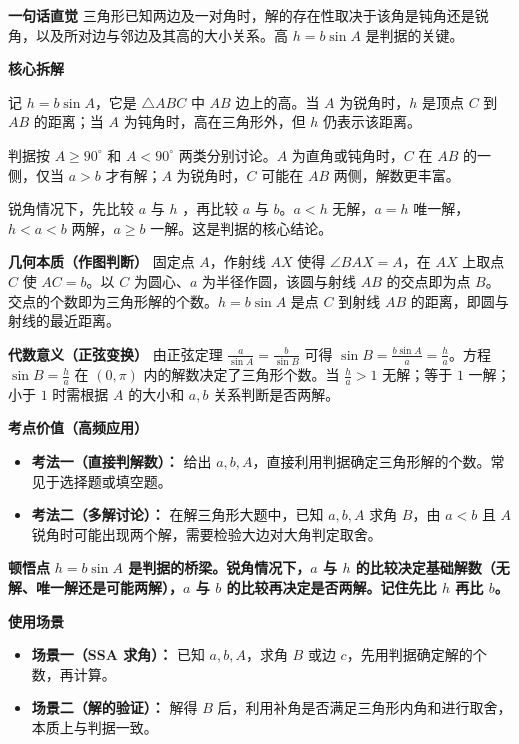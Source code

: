 \begin{explanationbox}
	\textbf{\textcolor{CExplanation}{一句话直觉}}
	三角形已知两边及一对角时，解的存在性取决于该角是钝角还是锐角，以及所对边与邻边及其高的大小关系。高 $h = b\sin A$ 是判据的关键。

	\medskip
	\textbf{\textcolor{CExplanation}{核心拆解}}
	\begin{description}[style=nextline, leftmargin=2.8em, labelsep=0.5em, itemsep=0.45em]
		\item[\textbf{要点一（几何高 h）：}]
			记 $h = b\sin A$，它是 $\triangle ABC$ 中 $AB$ 边上的高。当 $A$ 为锐角时，$h$ 是顶点 $C$ 到 $AB$ 的距离；当 $A$ 为钝角时，高在三角形外，但 $h$ 仍表示该距离。
		\item[\textbf{要点二（角分类）：}]
			判据按 $A\geq90^\circ$ 和 $A<90^\circ$ 两类分别讨论。$A$ 为直角或钝角时，$C$ 在 $AB$ 的一侧，仅当 $a>b$ 才有解；$A$ 为锐角时，$C$ 可能在 $AB$ 两侧，解数更丰富。
		\item[\textbf{要点三（大小比较）：}]
			锐角情况下，先比较 $a$ 与 $h$ ，再比较 $a$ 与 $b$。$a<h$ 无解，$a=h$ 唯一解，$h<a<b$ 两解，$a\geq b$ 一解。这是判据的核心结论。
	\end{description}

	\medskip
	\textbf{\textcolor{CExplanation}{几何本质（作图判断）}}
	固定点 $A$，作射线 $AX$ 使得 $\angle BAX = A$，在 $AX$ 上取点 $C$ 使 $AC=b$。以 $C$ 为圆心、$a$ 为半径作圆，该圆与射线 $AB$ 的交点即为点 $B$。交点的个数即为三角形解的个数。$h = b\sin A$ 是点 $C$ 到射线 $AB$ 的距离，即圆与射线的最近距离。

	\medskip
	\textbf{\textcolor{CExplanation}{代数意义（正弦变换）}}
	由正弦定理 $\frac{a}{\sin A}=\frac{b}{\sin B}$ 可得 $\sin B = \frac{b\sin A}{a} = \frac{h}{a}$。方程 $\sin B = \frac{h}{a}$ 在 $(0,\pi)$ 内的解数决定了三角形个数。当 $\frac{h}{a}>1$ 无解；等于 $1$ 一解；小于 $1$ 时需根据 $A$ 的大小和 $a,b$ 关系判断是否两解。

	\medskip
	\textbf{\textcolor{CExplanation}{考点价值（高频应用）}}
	\begin{itemize}[leftmargin=*, itemsep=0.5em, topsep=0.4em]
		\item \textbf{考法一（直接判解数）：} 给出 $a,b,A$，直接利用判据确定三角形解的个数。常见于选择题或填空题。
		\item \textbf{考法二（多解讨论）：} 在解三角形大题中，已知 $a,b,A$ 求角 $B$，由 $a<b$ 且 $A$ 锐角时可能出现两个解，需要检验大边对大角判定取舍。
	\end{itemize}

	\medskip
	\textbf{\textcolor{CExplanation}{顿悟点}}
	\textbf{$h = b\sin A$ 是判据的桥梁。锐角情况下，$a$ 与 $h$ 的比较决定基础解数（无解、唯一解还是可能两解），$a$ 与 $b$ 的比较再决定是否两解。记住先比 $h$ 再比 $b$。}

	\medskip
	\textbf{\textcolor{CExplanation}{使用场景}}
	\begin{itemize}[leftmargin=*, itemsep=0.5em, topsep=0.4em]
		\item \textbf{场景一（SSA 求角）：} 已知 $a,b,A$，求角 $B$ 或边 $c$，先用判据确定解的个数，再计算。
		\item \textbf{场景二（解的验证）：} 解得 $B$ 后，利用补角是否满足三角形内角和进行取舍，本质上与判据一致。
	\end{itemize}

\end{explanationbox}
